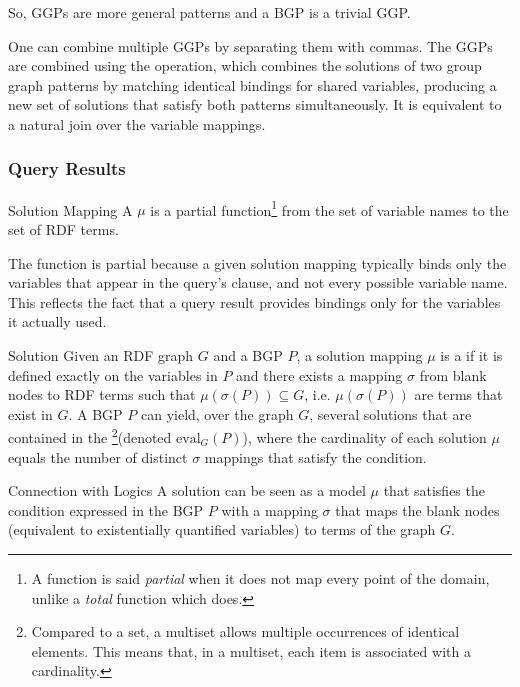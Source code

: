 So, GGPs are more general patterns and a BGP is a trivial GGP.

One can combine multiple GGPs by separating them with commas. The GGPs are combined using the  operation, which combines the solutions of two group graph patterns by matching identical bindings for shared variables, producing a new set of solutions that satisfy both patterns simultaneously. It is equivalent to a natural join over the variable mappings.

\subsubsection{Query Results}
\begin{definition}{Solution Mapping}
    A  \(\mu\) is a partial function\footnote{A function is said \emph{partial} when it does not map every point of the domain, unlike a \emph{total} function which does.} from the set of variable names to the set of RDF terms.
\end{definition}
The function is partial because a given solution mapping typically binds only the variables that appear in the query's  clause, and not every possible variable name. 
This reflects the fact that a query result provides bindings only for the variables it actually used.

\begin{definition}{Solution}
    Given an RDF graph \(G\) and a BGP \(P\), a solution mapping \(\mu\) is a  if it is defined exactly on the variables in \(P\) and there exists a mapping \(\sigma\) from blank nodes to RDF terms such that \(\mu(\sigma(P))\subseteq G\), i.e. \(\mu(\sigma(P))\) are terms that exist in \(G\).
    A BGP \(P\) can yield, over the graph \(G\), several solutions that are contained in the \footnote{Compared to a set, a multiset allows multiple occurrences of identical elements. This means that, in a multiset, each item is associated with a cardinality.}(denoted \(\text{eval}_G(P)\)), where the cardinality of each solution \(\mu\) equals the number of distinct \(\sigma\) mappings that satisfy the condition.
\end{definition}

\begin{note}{Connection with Logics}
    A solution can be seen as a model \(\mu\) that satisfies the condition expressed in the BGP \(P\) with a mapping \(\sigma\) that maps the blank nodes (equivalent to existentially quantified variables) to terms of the graph \(G\).
\end{note}

